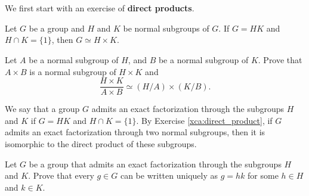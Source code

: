 \chapter{}


We first start with an exercise of \textbf{direct products}.

\begin{exercise}
\label{xca:direct_product}
Let $G$ be a group and $H$ and $K$ be normal subgroups of $G$.
If $G=HK$ and $H\cap K=\{1\}$, then $G\simeq H\times K$.
\end{exercise}




\begin{exercise}
Let $A$ be a normal subgroup of $H$, and $B$ be a normal subgroup of $K$. 
Prove that $A\times B$ is a normal subgroup of
$H\times K$ and 
\[
\frac{H\times K}{A\times B}\simeq(H/A)\times(K/B).
\]
\end{exercise}

We say that a group $G$ admits an exact factorization through 
the subgroups $H$ and $K$ if $G=HK$ and 
$H\cap K=\{1\}$. By Exercise \ref{xca:direct_product}, 
if $G$ admits an exact factorization through two normal subgroups, then 
it is isomorphic to the direct product of these subgroups. 

\begin{exercise}
    Let $G$ be a group that admits an exact factorization through
    the subgroups $H$ and $K$. Prove that every $g\in G$ can be written 
    uniquely as $g=hk$ for some $h\in H$ and $k\in K$. 
\end{exercise}


